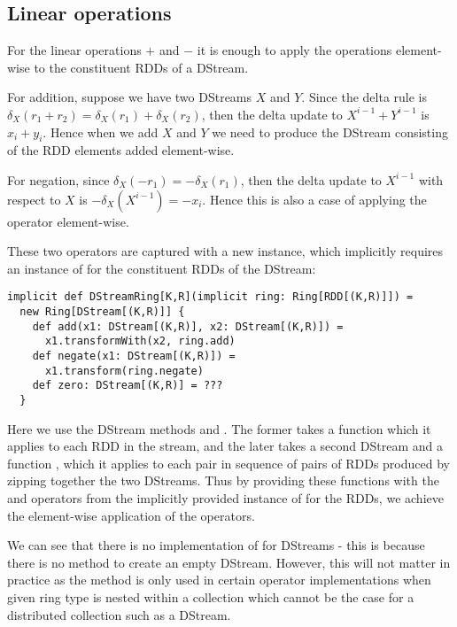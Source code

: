 \subsection{Linear operations}
For the linear operations $+$ and $-$ it is enough to apply the operations element-wise to the constituent RDDs of a DStream.

For addition, suppose we have two DStreams $X$ and $Y$. Since the delta rule is $\delta_X(r_1 + r_2) = \delta_X(r_1) + \delta_X(r_2)$, then the delta update to $X^{i-1} + Y^{i-1}$ is $x_i + y_i$. Hence when we add $X$ and $Y$ we need to produce the DStream consisting of the RDD elements added element-wise.

For negation, since $\delta_X(-r_1) = -\delta_X(r_1)$, then the delta update to $X^{i-1}$ with respect to $X$ is $-\delta_X(X^{i-1}) = -x_i$. Hence this is also a case of applying the operator element-wise.

These two operators are captured with a new  instance, which implicitly requires an instance of  for the constituent RDDs of the DStream:
\vs\begin{lstlisting}
implicit def DStreamRing[K,R](implicit ring: Ring[RDD[(K,R)]]) =
  new Ring[DStream[(K,R)]] {  
    def add(x1: DStream[(K,R)], x2: DStream[(K,R)]) =
      x1.transformWith(x2, ring.add)
    def negate(x1: DStream[(K,R)]) =
      x1.transform(ring.negate)
    def zero: DStream[(K,R)] = ???
  }
\end{lstlisting}\vs
Here we use the DStream methods  and . The former takes a function  which it applies to each RDD in the stream, and the later takes a second DStream and a function , which it applies to each pair in sequence of pairs of RDDs produced by zipping together the two DStreams. Thus by providing these functions with the  and  operators from the implicitly provided instance of   for the RDDs, we achieve the element-wise application of the operators.

We can see that there is no implementation of  for DStreams - this is because there is no method to create an empty DStream. However, this will not matter in practice as the  method is only used in certain operator implementations when given ring type is nested within a collection which cannot be the case for a distributed collection such as a DStream.
